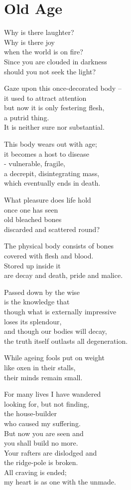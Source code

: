 
\chapter{Old Age}


Why is there laughter?\\
Why is there joy\\
when the world is on fire?\\
Since you are clouded in darkness\\
should you not seek the light?


Gaze upon this once-decorated body --\\
it used to attract attention\\
but now it is only festering flesh,\\
a putrid thing.\\
It is neither sure nor substantial.


This body wears out with age;\\
it becomes a host to disease\\
- vulnerable, fragile,\\
a decrepit, disintegrating mass,\\
which eventually ends in death.


What pleasure does life hold\\
once one has seen\\
old bleached bones\\
discarded and scattered round?


The physical body consists of bones\\
covered with flesh and blood.\\
Stored up inside it\\
are decay and death, pride and malice.


Passed down by the wise\\
is the knowledge that\\
though what is externally impressive\\
loses its splendour,\\
and though our bodies will decay,\\
the truth itself outlasts all degeneration.

While ageing fools put on weight\\
like oxen in their stalls,\\
their minds remain small.


For many lives I have wandered\\
looking for, but not finding,\\
the house-builder\\
who caused my suffering.\\
But now you are seen and\\
you shall build no more.\\
Your rafters are dislodged and\\
the ridge-pole is broken.\\
All craving is ended;\\
my heart is as one with the unmade.


